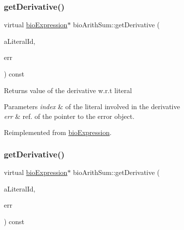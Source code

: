 \subsubsection{\texorpdfstring{get\+Derivative()}{getDerivative()}\hspace{0.1cm}{\footnotesize\ttfamily [3/4]}}
{\footnotesize\ttfamily virtual \hyperlink{classbio_expression}{bio\+Expression}$\ast$ bio\+Arith\+Sum\+::get\+Derivative (\begin{DoxyParamCaption}\item[{pat\+U\+Long}]{a\+Literal\+Id,  }\item[{pat\+Error $\ast$\&}]{err }\end{DoxyParamCaption}) const\hspace{0.3cm}{\ttfamily [virtual]}}

\begin{DoxyReturn}{Returns}
value of the derivative w.\+r.\+t literal 
\end{DoxyReturn}

\begin{DoxyParams}{Parameters}
{\em index} & of the literal involved in the derivative \\
\hline
{\em err} & ref. of the pointer to the error object. \\
\hline
\end{DoxyParams}


Reimplemented from \hyperlink{classbio_expression_a5915579d1193f25f216c1e273c97f2ce}{bio\+Expression}.

\mbox{\label{classbio_arith_sum_a2c030d0fea64581fe6f33031d3d3c977}} 
\subsubsection{\texorpdfstring{get\+Derivative()}{getDerivative()}\hspace{0.1cm}{\footnotesize\ttfamily [4/4]}}
{\footnotesize\ttfamily virtual \hyperlink{classbio_expression}{bio\+Expression}$\ast$ bio\+Arith\+Sum\+::get\+Derivative (\begin{DoxyParamCaption}\item[{pat\+U\+Long}]{a\+Literal\+Id,  }\item[{pat\+Error $\ast$\&}]{err }\end{DoxyParamCaption}) const\hspace{0.3cm}{\ttfamily [virtual]}}


